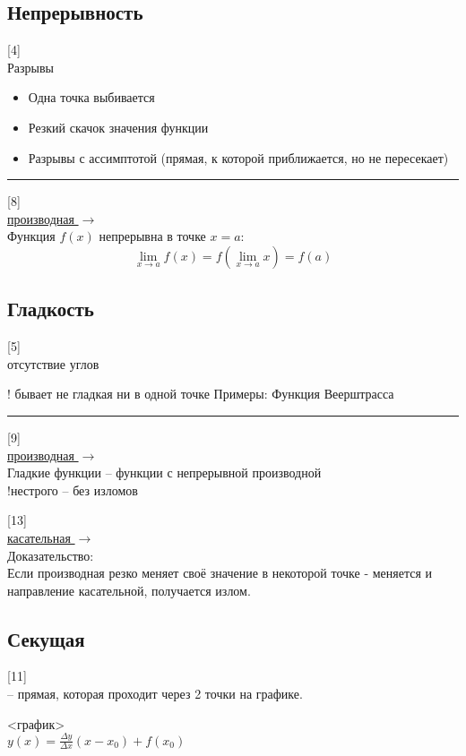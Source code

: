 \documentclass{article}
\begin{document}
\subsection{Непрерывность}
[4]\\
Разрывы

\begin{itemize}
    \item Одна точка выбивается
    \item Резкий скачок значения функции
    \item Разрывы с ассимптотой (прямая, к которой приближается, но не пересекает)
\end{itemize}

\noindent\rule{\textwidth}{1pt}
[8]\\

\hyperref[section:derivative]{производная $\to$}\\
Функция $f(x)$ непрерывна в точке $x=a$: $$\lim_{x \to a} f(x) = f(\lim_{x \to a} x) = f(a)$$

\subsection{Гладкость}
[5]\\
отсутствие углов

! бывает не гладкая ни в одной точке
Примеры:
Функция Веерштрасса

\noindent\rule{\textwidth}{1pt}
[9]\\

\hyperref[section:derivative]{производная $\to$}\\
Гладкие функции -- функции с непрерывной производной\\
!нестрого -- без изломов

[13]\\
\hyperref[section:tangent]{касательная $\to$}\\
Доказательство:\\
Если производная резко меняет своё значение в некоторой точке - меняется и направление касательной, получается излом.

\subsection{Секущая}
[11]\\
-- прямая, которая проходит через 2 точки на графике.

<график>\\
$y(x) = \frac{\Delta y}{\Delta x}(x - x_0) + f(x_0)$
\end{document}
